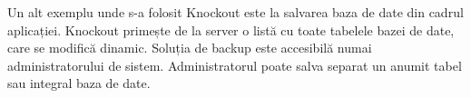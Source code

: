	Un alt exemplu unde s-a folosit Knockout este la salvarea baza de date din cadrul aplicației.
	Knockout primește de la server o listă cu toate tabelele bazei de date, care se modifică dinamic.
	Soluția de backup este accesibilă numai administratorului de sistem.
	Administratorul poate salva separat un anumit tabel sau integral baza de date.
